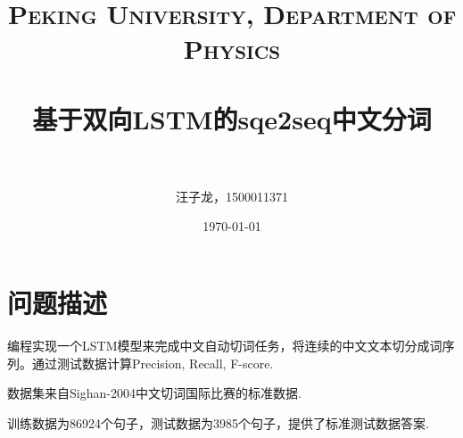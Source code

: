 \documentclass[paper=a4, fontsize=11pt]{scrartcl} %
\title{	
\normalfont \normalsize 
\textsc{Peking University, Department of Physics} \\ [25pt] %
\horrule{0.5pt} \\[0.4cm] %
\huge 基于双向LSTM的sqe2seq中文分词 \\ %
\horrule{2pt} \\[0.5cm] %
}
\author{汪子龙，1500011371} %
\date{\normalsize\today} %
\numberwithin{equation}{section} %
\numberwithin{figure}{section} %
\numberwithin{table}{section} %
\begin{document}
\maketitle %


\section{问题描述}



编程实现一个LSTM模型来完成中文自动切词任务，将连续的中文文本切分成词序列。通过测试数据计算Precision, Recall, F-score. 

数据集来自Sighan-2004中文切词国际比赛的标准数据.

训练数据为86924个句子，测试数据为3985个句子，提供了标准测试数据答案.




\end{document}
